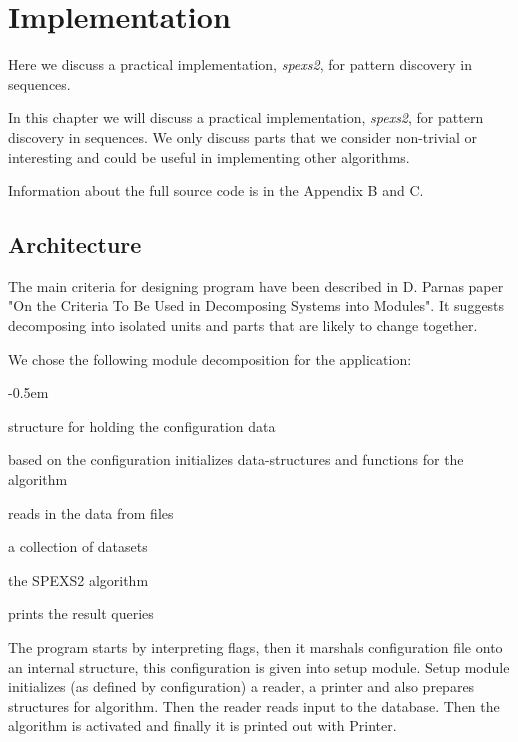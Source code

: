 \chapter{Implementation}
\label{c:implementation}

Here we discuss a practical implementation, \emph{spexs2}, for
pattern discovery in sequences. 

In this chapter we will discuss a practical implementation, \emph{spexs2}, for pattern discovery in sequences. We only discuss parts that we consider non-trivial or interesting and could be useful in implementing other algorithms.

Information about the full source code is in the Appendix B and C.

\section{Architecture}

The main criteria for designing program have been described in D. Parnas
paper "On the Criteria To Be Used in Decomposing Systems into Modules"\cite{Parnas72}. It suggests decomposing into isolated units and parts that are likely to change together.

We chose the following module decomposition for the application:

\begin{small}
\begin{description}
    \itemsep-0.5em
    \item[Configuration] structure for holding the configuration data
    \item[Setup] based on the configuration initializes data-structures and functions for the algorithm
    \item[Reader] reads in the data from files
    \item[Database] a collection of datasets
    \item[Algorithm] the SPEXS2 algorithm
    \item[Printer] prints the result queries
\end{description}
\end{small}

The program starts by interpreting flags, then it marshals configuration file onto an internal structure, this configuration is given into setup module. Setup module initializes (as defined by configuration) a reader, a printer and also prepares structures for algorithm. Then the reader reads input to the database. Then the algorithm is activated and finally it is printed out with Printer.

